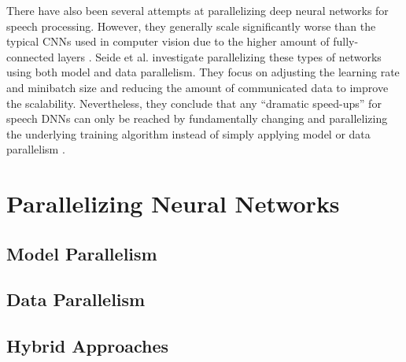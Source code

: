 \documentclass[conference,compsoc,a4paper]{IEEEtran}
\begin{document}
There have also been several attempts at parallelizing deep neural networks for speech processing.
However, they generally scale significantly worse than the typical CNNs used in computer vision due to the higher amount of fully-connected layers \cite{dean2012-Large-scale-distributed,seide2014-Speech-DNNs}.
Seide et al. \cite{seide2014-Speech-DNNs,seide2014-1-bit-stochastic} investigate parallelizing these types of networks using both model and data parallelism.
They focus on adjusting the learning rate and minibatch size \cite{seide2014-Speech-DNNs} and reducing the amount of communicated data \cite{seide2014-1-bit-stochastic} to improve the scalability.
Nevertheless, they conclude that any ``dramatic speed-ups'' for speech DNNs can only be reached by fundamentally changing and parallelizing the underlying training algorithm instead of simply applying model or data parallelism \cite{seide2014-Speech-DNNs,seide2014-1-bit-stochastic}.


\section{Parallelizing Neural Networks} %
\label{sec:parallelizing_neural_networks}

\subsection{Model Parallelism} %
\label{sub:model_parallelism}


\subsection{Data Parallelism} %
\label{sub:data_parallelism}


\subsection{Hybrid Approaches} %
\label{sub:hybrid_approaches}
\end{document}
